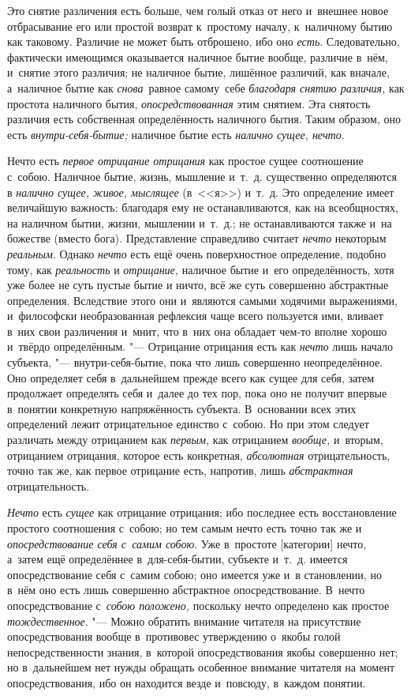 Это снятие различения есть больше, чем голый отказ от него и~внешнее новое
отбрасывание его или простой возврат к~простому началу, к~наличному бытию как
таковому. Различие не может быть отброшено, ибо оно {\em есть}. Следовательно,
фактически имеющимся оказывается наличное бытие вообще, различие в~нём,
и~снятие этого различия; не наличное бытие, лишённое различий, как вначале,
а~наличное бытие как {\em снова}~равное самому~себе
{\em благодаря снятию различия,} как простота наличного бытия,
{\em опосредствованная} этим снятием. Эта снятость различия есть
собственная определённость наличного бытия. Таким образом, оно есть
{\em внутри-себя-бытие;} наличное бытие есть {\em налично сущее, нечто}.

Нечто есть {\em первое отрицание отрицания} как простое
сущее соотношение с~собою. Наличное бытие, жизнь, мышление и~т.~д.
существенно определяются в {\em налично сущее,}
{\em живое, мыслящее} (в~<<я>>)
и~т.~д. Это определение имеет величайшую важность: благодаря ему не
останавливаются, как на всеобщностях, на наличном бытии, жизни, мышлении
и~т.~д.; не останавливаются также и~на божестве (вместо бога).
Представление справедливо считает {\em нечто} некоторым
{\em реальным}. Однако {\em нечто}
есть ещё очень поверхностное определение, подобно тому, как
{\em реальность} и {\em отрицание,}
наличное бытие и~его определённость, хотя уже более не суть пустые бытие и
ничто, всё же суть совершенно абстрактные определения. Вследствие этого они
и~являются самыми ходячими выражениями, и~философски необразованная
рефлексия чаще всего пользуется ими, вливает в~них свои различения и~мнит,
что в~них она обладает чем-то вполне хорошо и~твёрдо определённым. "---
Отрицание отрицания есть как {\em нечто} лишь начало
субъекта, "--- внутри-себя-бытие, пока что лишь совершенно неопределённое. Оно
определяет себя в~дальнейшем прежде всего как сущее для себя, затем
продолжает определять себя и~далее до тех пор, пока оно не получит впервые
в~понятии конкретную напряжённость субъекта. В~основании всех этих
определений лежит отрицательное единство с~собою. Но при этом следует
различать между отрицанием как {\em первым,} как
отрицанием {\em вообще,} и~вторым, отрицанием
отрицания, которое есть конкретная, {\em абсолютная}
отрицательность, точно так же, как первое отрицание есть, напротив, лишь
{\em абстрактная} отрицательность.

{\em Нечто} есть {\em сущее} как отрицание отрицания; ибо последнее есть
восстановление простого соотношения с~собою; но тем самым нечто есть точно так
же и {\em опосредствование себя с~самим собою}. Уже в~простоте [категории]
нечто, а~затем ещё определённее в~для-себя-бытии, субъекте и~т.~д. имеется
опосредствование себя с~самим собою; оно имеется уже и~в становлении, но в~нём
оно есть лишь совершенно абстрактное опосредствование. В~нечто опосредствование
с~{\em собою положено,} поскольку нечто определено как простое
{\em тождественное}. "--- Можно обратить внимание читателя на присутствие
опосредствования вообще в~противовес утверждению о~якобы голой
непосредственности знания, в~которой опосредствования якобы совершенно нет; но
в~дальнейшем нет нужды обращать особенное внимание читателя на момент
опосредствования, ибо он находится везде и~повсюду, в~каждом понятии.

